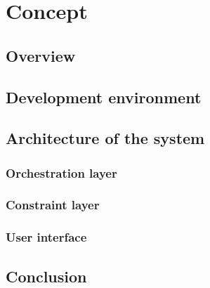 \chapter{Concept}
\doit

\section{Overview}
\doit

\section{Development environment}
\doit


\section{Architecture of the system}
\doit


\subsection{Orchestration layer}
\doit

\subsection{Constraint layer}
\doit

\subsection{User interface}
\doit

\section{Conclusion}
\doit
